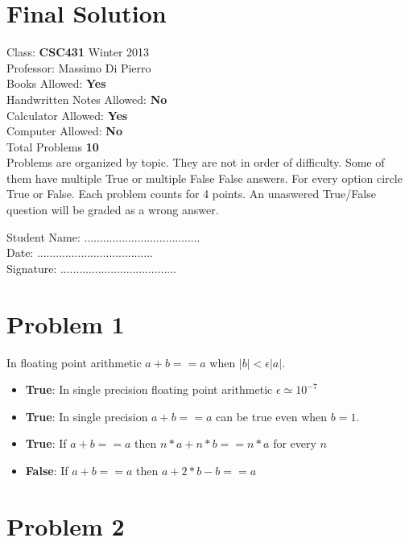 \documentclass[12pt]{article}
\begin{document}
\section*{Final Solution}

\noindent Class: {\bf CSC431} Winter 2013 \\
\noindent Professor: Massimo Di Pierro \\
\noindent Books Allowed: {\bf Yes} \\
\noindent Handwritten Notes Allowed: {\bf No} \\
\noindent Calculator Allowed: {\bf Yes} \\
\noindent Computer Allowed: {\bf No} \\
\noindent Total Problems {\bf 10} \\

Problems are organized by topic. They are not in order of difficulty. Some of them have multiple True or multiple False False answers. For every option circle True or False. Each problem counts for 4 points. An unaswered True/False question will be graded as a wrong answer.

\hskip 5cm

\noindent Student Name: ..................................... \\
\noindent Date: ..................................... \\
\noindent Signature: ..................................... \\

\newpage\section{Problem 1}

\noindent In floating point arithmetic $a+b==a$ when $|b|<\epsilon |a|$. 

\begin{itemize}
\item {\bf True}: In single precision floating point arithmetic $\epsilon \simeq 10^{-7}$
\item {\bf True}: In single precision $a+b==a$ can be true even when $b=1$.
\item {\bf True}: If $a+b==a$ then $n*a + n*b == n*a$ for every $n$
\item {\bf False}: If $a+b==a$ then $a+2*b-b==a$
\end{itemize}

\newpage\section{Problem 2}
\end{document}
